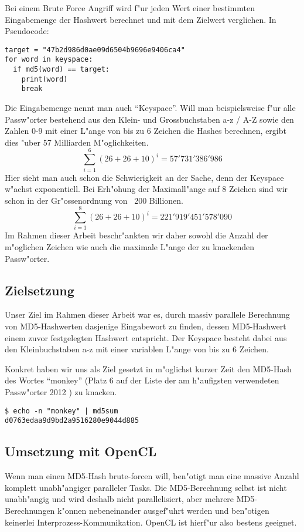 \begin{refsection}
Bei einem Brute Force Angriff wird f"ur jeden Wert einer bestimmten
Eingabemenge der Hash\-wert berechnet und mit dem Zielwert verglichen. In
Pseudocode:

\begin{verbatim}
target = "47b2d986d0ae09d6504b9696e9406ca4"
for word in keyspace:
  if md5(word) == target:
    print(word)
    break
\end{verbatim}

Die Eingabemenge nennt man auch ``Keyspace''. Will man beispielsweise f"ur alle
Passw"orter bestehend aus den Klein- und Grossbuchstaben a-z / A-Z sowie den
Zahlen 0-9 mit einer L"ange von bis zu 6 Zeichen die Hashes berechnen, ergibt
dies "uber 57 Milliarden M"oglichkeiten.
\[
	\sum_{i=1}^{6} \left(26 + 26 + 10\right)^i = 57'731'386'986
\]
Hier sieht man auch schon die Schwierigkeit an der Sache, denn der Keyspace
w"achst exponentiell. Bei Erh"ohung der Maximall"ange auf 8 Zeichen sind wir schon
in der Gr"ossenordnung von ~200 Billionen.
\[
	\sum_{i=1}^{8} \left(26 + 26 + 10\right)^i = 221'919'451'578'090
\]
Im Rahmen dieser Arbeit beschr"ankten wir daher sowohl die Anzahl der m"oglichen
Zeichen wie auch die maximale L"ange der zu knackenden Passw"orter.

\subsection{Zielsetzung}

Unser Ziel im Rahmen dieser Arbeit war es, durch massiv parallele Berechnung von
MD5-Hashwerten dasjenige Eingabewort zu finden, dessen MD5-Hashwert einem zuvor
festgelegten Hashwert entspricht. Der Keyspace besteht dabei aus den
Kleinbuchstaben a-z mit einer variablen L"ange von bis zu 6 Zeichen.

Konkret haben wir uns als Ziel gesetzt in m"oglichst kurzer Zeit den MD5-Hash
des Wortes ``monkey'' (Platz 6 auf der Liste der am h"aufigsten verwendeten
Passw"orter 2012 \cite{crypto:splash2012}) zu knacken.

\begin{verbatim}
$ echo -n "monkey" | md5sum
d0763edaa9d9bd2a9516280e9044d885
\end{verbatim}

\subsection{Umsetzung mit OpenCL}

Wenn man einen MD5-Hash brute-forcen will, ben"otigt man eine massive Anzahl
komplett unabh"angiger paralleler Tasks. Die MD5-Berechnung selbst ist nicht
unabh"angig und wird deshalb nicht parallelisiert, aber mehrere MD5-Berechnungen
k"onnen nebeneinander ausgef"uhrt werden und ben"otigen keinerlei
Interprozess-Kommunikation. OpenCL ist hierf"ur also bestens geeignet.


\end{refsection}
